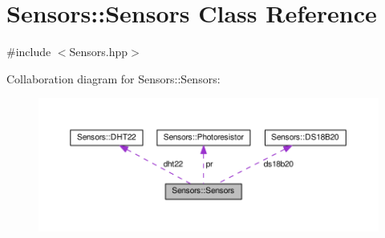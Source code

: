 \hypertarget{classSensors_1_1Sensors}{}\section{Sensors\+:\+:Sensors Class Reference}
\label{classSensors_1_1Sensors}


{\ttfamily \#include $<$Sensors.\+hpp$>$}



Collaboration diagram for Sensors\+:\+:Sensors\+:\nopagebreak
\begin{figure}[H]
\begin{center}
\leavevmode
\includegraphics[width=350pt]{classSensors_1_1Sensors__coll__graph}
\end{center}
\end{figure}
